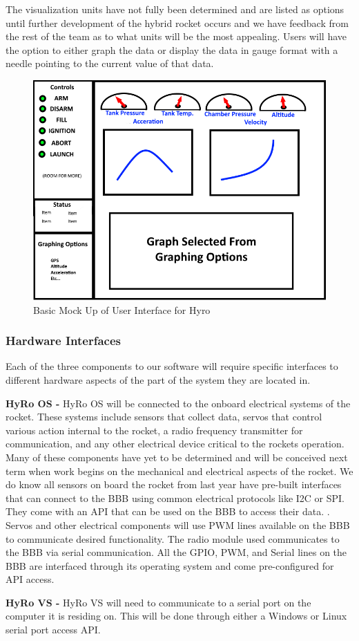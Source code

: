 \documentclass[10pt,draftclsnofoot,onecolumn,compsoc]{IEEEtran}
\begin{document}
The visualization units have not fully been determined and are listed as options until further development of the hybrid rocket occurs and we have feedback from the rest of the team as to what units will be the most appealing. Users will have the option to either graph the data or display the data in gauge format with a needle pointing to the current value of that data. \par

\begin{figure}
  \caption{Basic Mock Up of User Interface for Hyro}
  \centering
	\includegraphics[scale=.75]{HyRoUIMockup}
\end{figure}
\FloatBarrier
\subsubsection{Hardware Interfaces}
Each of the three components to our software will require specific interfaces to different hardware aspects of the part of the system they are located in.\par
{\bf HyRo OS -}
 	HyRo OS will be connected to the onboard electrical systems of the rocket. These systems include sensors that collect data, servos that control various action internal to the rocket, a radio frequency transmitter for communication, and any other electrical device critical to the rockets operation. Many of these components have yet to be determined and will be conceived next term when work begins on the mechanical and electrical aspects of the rocket.  We do know all sensors on board the rocket from last year have pre-built interfaces that can connect to the BBB using common electrical protocols like I2C or SPI. They come with an API that can be used on the BBB to access their data. . Servos and other electrical components will use PWM lines available on the BBB to communicate desired functionality. The radio module used communicates to the BBB via serial communication. All the GPIO, PWM, and Serial lines on the BBB are interfaced through its operating system and come pre-configured for API access.\par
{\bf HyRo VS -}
HyRo VS will need to communicate to a serial port on the computer it is residing on.  This will be done through either a Windows or Linux serial port access API.
\end{document}
